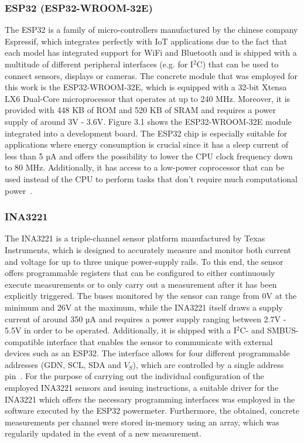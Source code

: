 \subsubsection{ESP32 (ESP32-WROOM-32E)}
The ESP32 is a family of micro-controllers manufactured by the chinese company Espressif, which integrates perfectly with IoT applications due to the fact that each model has integrated support for WiFi and Bluetooth and is shipped with a multitude of different peripheral interfaces (e.g. for I$^{2}$C) that can be used to connect sensors, displays or cameras. The concrete module that was employed for this work is the ESP32-WROOM-32E, which is equipped with a 32-bit Xtensa LX6 Dual-Core microprocessor that operates at up to 240 MHz. Moreover, it is provided with 448 KB of ROM and 520 KB of SRAM and requires a power supply of around 3V - 3.6V. Figure 3.1 shows the ESP32-WROOM-32E module integrated into a development board. The ESP32 chip is especially suitable for applications where energy consumption is crucial since it has a sleep current of less than 5 µA and offers the possibility to lower the CPU clock frequency down to 80 MHz. Additionally, it has access to a low-power coprocessor that can be used instead of the CPU to perform tasks that don't require much computational power~\parencite{esp32-manual}.

\subsubsection{INA3221}
The INA3221 is a triple-channel sensor platform manufactured by Texas Instruments, which is designed to accurately measure and monitor both current and voltage for up to three unique power-supply rails. To this end, the sensor offers programmable registers that can be configured to either continuously execute measurements or to only carry out a measurement after it has been explicitly triggered. The buses monitored by the sensor can range from 0V at the minimum and 26V at the maximum, while the INA3221 itself draws a supply current of around 350 µA and requires a power supply ranging between 2.7V - 5.5V in order to be operated. Additionally, it is shipped with a I$^{2}$C- and SMBUS-compatible interface that enables the sensor to communicate with external devices such as an ESP32. The interface allows for four different programmable addresses (GDN, SCL, SDA and $V_{S}$), which are controlled by a single address pin~\parencite{ina3221-manual}. For the purpose of carrying out the individual configuration of the employed INA3221 sensors and issuing instructions, a suitable driver for the INA3221 which offers the necessary programming interfaces was employed in the software executed by the ESP32 powermeter. Furthermore, the obtained, concrete measurements per channel were stored in-memory using an array, which was regularily updated in the event of a new measurement.

